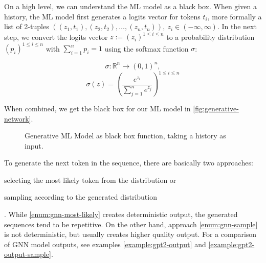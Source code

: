 \documentclass[english,version-2020-11]{uzl-thesis}
\begin{document}
On a high level, we can understand the ML model as a black box.
When given a history, the ML model first generates a logits vector for tokens $t_i$, more formally a list of 2-tuples $((z_1, t_1), (z_2, t_2), \dots, (z_n, t_n)),~ z_i \in ( -\infty, \infty )$.
In the next step, we convert the logits vector $z := (z_i)^{1 \leq i \leq n}$ to a probability distribution $(p_i)^{1 \leq i \leq n}$ with $\sum_{i=1}^n p_i = 1$ using the softmax function $\sigma$:

$$\sigma \colon \mathbb{R}^n \rightarrow (0,1)^n,$$
$$\sigma(z) = \left(\frac{e^{z_i}}{\sum_{j=1}^n e^{z_j}}\right)^{1 \leq i \leq n}$$

When combined, we get the black box for our ML model in \autoref{fig:generative-network}.

\begin{figure}[htpb]
	\centering
	 \label{fig:generative-network}
	\caption{Generative ML Model as black box function, taking a history as input.}
\end{figure}
To generate the next token in the sequence, there are basically two approaches:
\begin{enumerate*}[label=(\roman*)] \item \label{enum:gnn-most-likely} selecting the most likely token from the distribution or \item \label{enum:gnn-sample} sampling according to the generated distribution \end{enumerate*}.
While \ref{enum:gnn-most-likely} creates deterministic output, the generated sequences tend to be repetitive.
On the other hand, approach \ref{enum:gnn-sample} is not deterministic, but usually creates higher quality output.
For a comparison of GNN model outputs, see examples \ref{example:gpt2-output} and \ref{example:gpt2-output-sample}.
\end{document}

